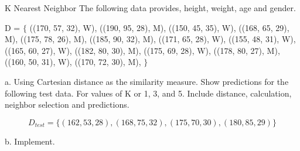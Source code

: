 \documentclass{homeworg}
\begin{document}
K Nearest Neighbor
The following data provides, height, weight, age and gender.

D = $\{$ \newline
((170, 57, 32), W), \newline
 ((190, 95, 28), M), \newline
 ((150, 45, 35), W), \newline
 ((168, 65, 29), M), \newline
 ((175, 78, 26), M), \newline
 ((185, 90, 32), M), \newline
 ((171, 65, 28), W), \newline
 ((155, 48, 31), W), \newline
 ((165, 60, 27), W), \newline
 ((182, 80, 30), M), \newline
 ((175, 69, 28), W), \newline
 ((178, 80, 27), M), \newline
 ((160, 50, 31), W), \newline
 ((170, 72, 30), M), \newline
$\}$

a. Using Cartesian distance as the similarity measure. Show predictions for the
following test data. For values of K or 1, 3, and 5. Include distance, calculation,
neighbor selection and predictions.

$$
D_{test} = \{(162, 53, 28), (168, 75, 32), (175, 70, 30), (180, 85, 29) \}
$$

b. Implement.

\exercise*
\end{document}
